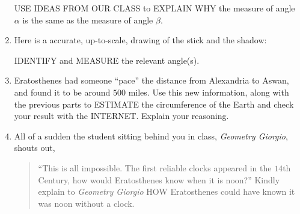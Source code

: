 \documentclass[noauthor,nooutcomes,handout]{ximera}
\begin{document}
\begin{question}
\begin{enumerate}
\begin{center}
    \end{center}
    USE IDEAS FROM OUR CLASS to EXPLAIN WHY the measure of angle
    $\alpha$ is the same as the measure of angle $\beta$.
  \item Here is a accurate, up-to-scale, drawing of the stick and the shadow:
    \begin{center}
    \end{center}
    IDENTIFY and MEASURE the relevant angle(s).
  \item Eratosthenes had someone ``pace'' the distance from Alexandria
    to Aswan, and found it to be around $500$ miles. Use this new
    information, along with the previous parts to ESTIMATE the
    circumference of the Earth and check your result with the
    INTERNET. Explain your reasoning.
  \item All of a sudden the student sitting behind you in class,
    \textit{Geometry Giorgio}, shouts out,
    \begin{quote}
      ``This is all
      impossible. The first reliable clocks appeared in the $14$th
      Century, how would Eratosthenes know when it is noon?'' Kindly
      explain to \textit{Geometry Giorgio} HOW Eratosthenes could have
      known it was noon without a clock.
    \end{quote}

\end{enumerate}
\end{question}
\end{document}
